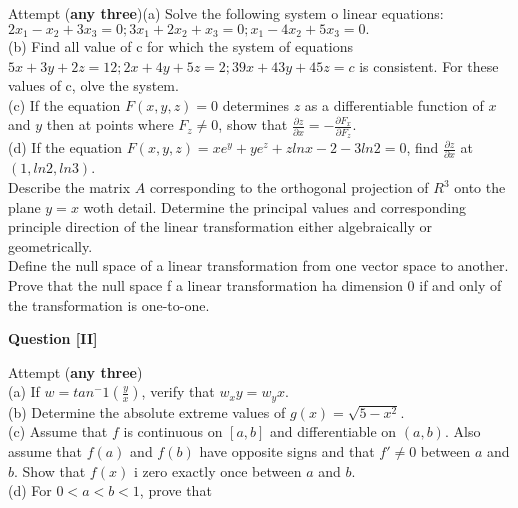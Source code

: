 \documentclass[12pt, a4paper]{exam}
\begin{document}
\begin{questions}
\question Attempt (\textbf{any three})\newline(a) Solve the following system o linear equations: \\
\begin{math}
2x_1 -x_2 + 3x_3 = 0; 3x_1 + 2x_2 + x_3 = 0; x_1 - 4x_2 + 5x_3 = 0.
\end{math}
\\(b) Find all value of c for which the system of equations \begin{math} 5x + 3y + 2z = 12; 2x + 4y + 5z = 2; 39x + 43y + 45z = c \end{math} is consistent. For these values of c, olve the system.
\\(c) If the equation \begin{math}F(x,y,z) = 0\end{math} determines \begin{math} z\end{math} as a differentiable function of \begin{math} x\end{math} and \begin{math} y\end{math} 
then at points where \begin{math} F_z \neq 0\end{math}, show that \begin{math} \frac{\partial z}{\partial x} = -\frac{\partial F_x}{\partial F_z} \end{math}.
\\
(d) If the equation $F(x,y,z) = xe^y + y e^z + zlnx - 2 - 3ln2 = 0$, find $\frac{\partial z}{\partial x}$ at $(1, ln2, ln3)$.\\

\question Describe the matrix $A$ corresponding to the orthogonal projection of $R^3$ onto the plane $y = x$ woth detail. Determine the principal values and corresponding principle direction of the linear transformation either algebraically or geometrically.\\

\question Define the null space of a linear transformation from one vector space to another. Prove that the null space f  a linear transformation ha dimension 0 if and only of the transformation is one-to-one.
\\
\end{questions}
\textbf{Question [II]}\\
\begin{questions}
\question Attempt (\textbf{any three})\\
(a) If $ w = tan^-1(\frac{y}{x})$, verify that $w_xy = w_yx$.\\
(b) Determine the absolute extreme values of $g(x) = \sqrt{5-x^2}$.\\
(c) Assume that $f$ is continuous on $[a,b]$ and differentiable on $ (a,b)$. Also assume that $f(a)$ and $f(b)$ have opposite signs and that $f' \neq 0$ between $a$ and $b$. Show that $f(x)$ i zero exactly once between $a$ and $b$.\\
(d) For $0< a < b < 1$, prove that 
\end{questions}
\end{document}
